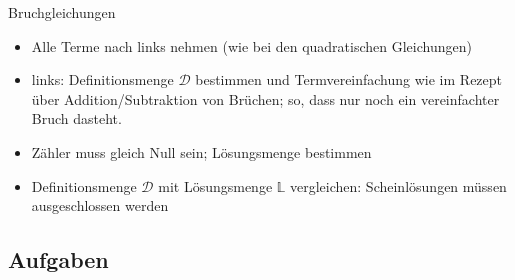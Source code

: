 \begin{rezept}{Bruchgleichungen}{}
  \begin{itemize}
  \item Alle Terme nach links nehmen (wie bei den quadratischen Gleichungen)
  \item links: Definitionsmenge $\mathcal{D}$ bestimmen und
    Termvereinfachung wie im Rezept über Addition/Subtraktion von
    Brüchen\fi{}; so, dass nur noch ein vereinfachter Bruch dasteht.
  \item Zähler muss gleich Null sein; Lösungsmenge bestimmen
   \item Definitionsmenge $\mathcal{D}$ mit Lösungsmenge $\mathbb{L}$
     vergleichen: Scheinlösungen müssen ausgeschlossen werden
  \end{itemize}
  
\end{rezept}

\subsection*{Aufgaben}







\newpage

